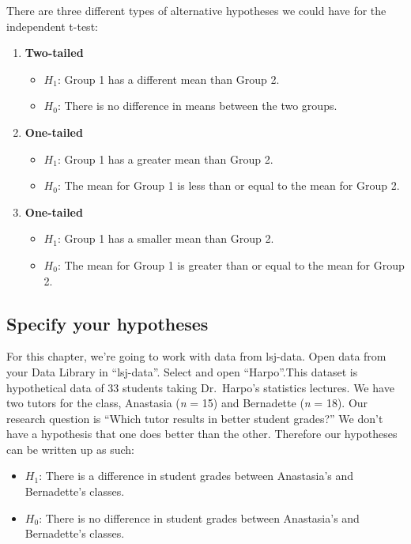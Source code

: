 \documentclass[
]{book}
\providecommand{\tightlist}{%
  \setlength{\itemsep}{0pt}\setlength{\parskip}{0pt}}
\begin{document}
There are three different types of alternative hypotheses we could have for the independent t-test:

\begin{enumerate}
\def\labelenumi{\arabic{enumi}.}
\item
  \textbf{Two-tailed}

  \begin{itemize}
  \tightlist
  \item
    \(H_1\): Group 1 has a different mean than Group 2.
  \item
    \(H_0\): There is no difference in means between the two groups.
  \end{itemize}
\item
  \textbf{One-tailed}

  \begin{itemize}
  \tightlist
  \item
    \(H_1\): Group 1 has a greater mean than Group 2.
  \item
    \(H_0\): The mean for Group 1 is less than or equal to the mean for Group 2.
  \end{itemize}
\item
  \textbf{One-tailed}

  \begin{itemize}
  \tightlist
  \item
    \(H_1\): Group 1 has a smaller mean than Group 2.
  \item
    \(H_0\): The mean for Group 1 is greater than or equal to the mean for Group 2.
  \end{itemize}
\end{enumerate}

\hypertarget{specify-your-hypotheses}{%
\subsection{Specify your hypotheses}\label{specify-your-hypotheses}}

For this chapter, we're going to work with data from lsj-data. Open data from your Data Library in ``lsj-data''. Select and open ``Harpo''.This dataset is hypothetical data of 33 students taking Dr.~Harpo's statistics lectures. We have two tutors for the class, Anastasia (\emph{n} = 15) and Bernadette (\emph{n} = 18). Our research question is ``Which tutor results in better student grades?'' We don't have a hypothesis that one does better than the other. Therefore our hypotheses can be written up as such:

\begin{itemize}
\tightlist
\item
  \(H_1\): There is a difference in student grades between Anastasia's and Bernadette's classes.
\item
  \(H_0\): There is no difference in student grades between Anastasia's and Bernadette's classes.
\end{itemize}
\end{document}
